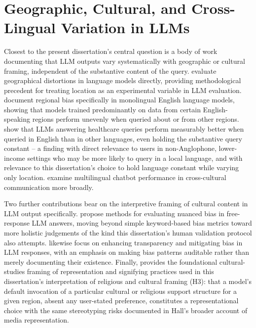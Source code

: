\section{Geographic, Cultural, and Cross-Lingual Variation in LLMs}

Closest to the present dissertation's central question is a body of work documenting that LLM outputs vary systematically with geographic or cultural framing, independent of the substantive content of the query. \citet{decoupes2025geographical} evaluate geographical distortions in language models directly, providing methodological precedent for treating location as an experimental variable in LLM evaluation. \citet{lyu2024regional} document regional bias specifically in monolingual English language models, showing that models trained predominantly on data from certain English-speaking regions perform unevenly when queried about or from other regions. \citet{jin2024english} show that LLMs answering healthcare queries perform measurably better when queried in English than in other languages, even holding the substantive query constant -- a finding with direct relevance to users in non-Anglophone, lower-income settings who may be more likely to query in a local language, and with relevance to this dissertation's choice to hold language constant while varying only location. \citet{orosoo2024multilingual} examine multilingual chatbot performance in cross-cultural communication more broadly.

Two further contributions bear on the interpretive framing of cultural content in LLM output specifically. \citet{healey2024bias} propose methods for evaluating nuanced bias in free-response LLM answers, moving beyond simple keyword-based bias metrics toward more holistic judgements of the kind this dissertation's human validation protocol also attempts. \citet{gupta2024transparency} likewise focus on enhancing transparency and mitigating bias in LLM responses, with an emphasis on making bias patterns auditable rather than merely documenting their existence. Finally, \citet{hall2024representation} provides the foundational cultural-studies framing of representation and signifying practices used in this dissertation's interpretation of religious and cultural framing (H3): that a model's default invocation of a particular cultural or religious support structure for a given region, absent any user-stated preference, constitutes a representational choice with the same stereotyping risks documented in Hall's broader account of media representation.

